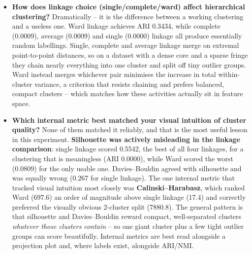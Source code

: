 \documentclass[12pt,a4paper]{article}
\DeclareRobustCommand{\_}{\textunderscore\allowbreak}
\begin{document}
\begin{itemize}
silhouette of any method here -- evidence that excluding the sparse boundary
points genuinely sharpens the remaining structure, which is exactly what
DBSCAN is for and what neither K-Means nor HAC can do (both are forced to
assign every point). It also found small clusters that the partitional methods
cannot express: the $\epsilon = 5.0$ solution splits into 13 clusters, several
of them small sub-groups within the dynamic activities. The important
qualification is that \textbf{DBSCAN completely failed on the raw
561-dimensional data} -- 100\% noise at $\epsilon \le 7.5$, and 44.5\% noise at
best -- so its success is conditional on the PCA reduction, not intrinsic.
\item \textbf{How does linkage choice (single/complete/ward) affect
hierarchical clustering?} Dramatically -- it is the difference between a
working clustering and a useless one. Ward linkage achieves ARI 0.3434, while
complete (0.0009), average (0.0009) and single (0.0000) linkage all produce
essentially random labellings. Single, complete and average linkage merge on
extremal point-to-point distances, so on a dataset with a dense core and a
sparse fringe they chain nearly everything into one cluster and split off tiny
outlier groups. Ward instead merges whichever pair minimises the increase in
total within-cluster variance, a criterion that resists chaining and prefers
balanced, compact clusters -- which matches how these activities actually sit
in feature space.
\item \textbf{Which internal metric best matched your visual intuition of
cluster quality?} None of them matched it reliably, and that is
the most useful lesson in this experiment. \textbf{Silhouette was actively
misleading in the linkage comparison}: single linkage scored 0.5542, the best
of all four linkages, for a clustering that is meaningless (ARI 0.0000), while
Ward scored the worst (0.0809) for the only usable one. Davies--Bouldin agreed
with silhouette and was equally wrong (0.267 for single linkage). The one
internal metric that tracked visual intuition most closely was
\textbf{Calinski--Harabasz}, which ranked Ward (697.6) an order of magnitude
above single linkage (17.4) and correctly preferred the visually obvious
2-cluster split (7880.8). The general pattern is that silhouette and
Davies--Bouldin reward compact, well-separated clusters \emph{whatever those
clusters contain} -- so one giant cluster plus a few tight outlier groups can
score beautifully. Internal metrics are best read alongside a projection plot
and, where labels exist, alongside ARI/NMI.
\end{itemize}
\end{document}
